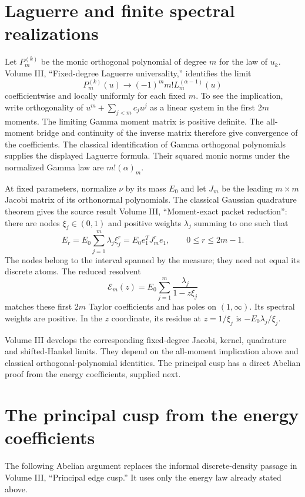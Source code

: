\section{Laguerre and finite spectral realizations}

Let $P_m^{(k)}$ be the monic orthogonal polynomial of degree $m$ for the law of $u_k$. Volume III, ``Fixed-degree Laguerre universality,'' identifies the limit
\[
P_m^{(k)}(u)\longrightarrow
(-1)^m m!L_m^{(\alpha-1)}(u)
\]
coefficientwise and locally uniformly for each fixed $m$. To see the implication, write orthogonality of
$u^m+\sum_{j<m}c_ju^j$ as a linear system in the first $2m$ moments. The limiting Gamma moment matrix is positive definite. The all-moment bridge and continuity of the inverse matrix therefore give convergence of the coefficients. The classical identification of Gamma orthogonal polynomials supplies the displayed Laguerre formula. Their squared monic norms under the normalized Gamma law are $m!(\alpha)_m$.

At fixed parameters, normalize $\nu$ by its mass $E_0$ and let $J_m$ be the leading $m\times m$ Jacobi matrix of its orthonormal polynomials. The classical Gaussian quadrature theorem gives the source result Volume III, ``Moment-exact packet reduction'': there are nodes $\xi_j\in(0,1)$ and positive weights $\lambda_j$ summing to one such that
\[
E_r=E_0\sum_{j=1}^m\lambda_j\xi_j^r
=E_0e_1^TJ_m^re_1,
\qquad 0\le r\le2m-1.
\]
The nodes belong to the interval spanned by the measure; they need not equal its discrete atoms. The reduced resolvent
\[
\mathcal E_m(z)=E_0\sum_{j=1}^m
\frac{\lambda_j}{1-z\xi_j}
\]
matches these first $2m$ Taylor coefficients and has poles on $(1,\infty)$. Its spectral weights are positive. In the $z$ coordinate, its residue at $z=1/\xi_j$ is $-E_0\lambda_j/\xi_j$.

Volume III develops the corresponding fixed-degree Jacobi, kernel, quadrature and shifted-Hankel limits. They depend on the all-moment implication above and classical orthogonal-polynomial identities. The principal cusp has a direct Abelian proof from the energy coefficients, supplied next.


\section{The principal cusp from the energy coefficients}

The following Abelian argument replaces the informal discrete-density passage
in Volume III, ``Principal edge cusp.'' It uses only the energy law already
stated above.

